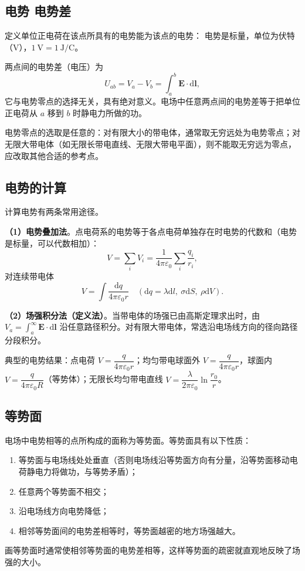     \subsection{电势 电势差}
    定义单位正电荷在该点所具有的电势能为该点的电势：
    电势是标量，单位为伏特（$\mathrm{V}$），$1\ \mathrm{V}=1\ \mathrm{J/C}$。

    两点间的电势差（电压）为
    \[
    U_{ab}=V_a-V_b=\int_a^b\boldsymbol{E}\cdot\mathrm{d}\boldsymbol{l},
    \]
    它与电势零点的选择无关，具有绝对意义。电场中任意两点间的电势差等于把单位正电荷从 $a$ 移到 $b$ 时静电力所做的功。

    电势零点的选取是任意的：对有限大小的带电体，通常取无穷远处为电势零点；对无限大带电体（如无限长带电直线、无限大带电平面），则不能取无穷远为零点，应改取其他合适的参考点。

    \subsection{电势的计算}
    计算电势有两条常用途径。

    \textbf{（1）电势叠加法}。点电荷系的电势等于各点电荷单独存在时电势的代数和（电势是标量，可以代数相加）：
    \[
    V=\sum_i V_i=\frac{1}{4\pi\varepsilon_0}\sum_i\frac{q_i}{r_i},
    \]
    对连续带电体
    \[
    V=\int\frac{\mathrm{d}q}{4\pi\varepsilon_0 r}
    \quad\left(\mathrm{d}q=\lambda\mathrm{d}l,\ \sigma\mathrm{d}S,\ \rho\mathrm{d}V\right).
    \]

    \textbf{（2）场强积分法（定义法）}。当带电体的场强已由高斯定理求出时，由 $V_a=\int_a^{\infty}\boldsymbol{E}\cdot\mathrm{d}\boldsymbol{l}$ 沿任意路径积分。对有限大带电体，常选沿电场线方向的径向路径分段积分。

    典型的电势结果：点电荷 $V=\dfrac{q}{4\pi\varepsilon_0r}$；均匀带电球面外 $V=\dfrac{q}{4\pi\varepsilon_0r}$，球面内 $V=\dfrac{q}{4\pi\varepsilon_0R}$（等势体）；无限长均匀带电直线 $V=\dfrac{\lambda}{2\pi\varepsilon_0}\ln\dfrac{r_0}{r}$。

    \subsection{等势面}
    电场中电势相等的点所构成的面称为等势面。等势面具有以下性质：
    \begin{enumerate}
        \item 等势面与电场线处处垂直（否则电场线沿等势面方向有分量，沿等势面移动电荷静电力将做功，与等势矛盾）；
        \item 任意两个等势面不相交；
        \item 沿电场线方向电势降低；
        \item 相邻等势面间的电势差相等时，等势面越密的地方场强越大。
    \end{enumerate}
    画等势面时通常使相邻等势面的电势差相等，这样等势面的疏密就直观地反映了场强的大小。


